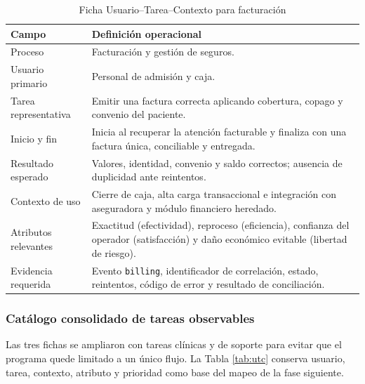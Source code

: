 \begin{table}[H]
\centering
\caption{Ficha Usuario--Tarea--Contexto para facturación}
\label{tab:utc-facturacion}
\begin{tabularx}{\textwidth}{p{3.5cm}Y}
\toprule
Campo & Definición operacional \\
\midrule
Proceso & Facturación y gestión de seguros. \\
Usuario primario & Personal de admisión y caja. \\
Tarea representativa & Emitir una factura correcta aplicando cobertura, copago y convenio del paciente. \\
Inicio y fin & Inicia al recuperar la atención facturable y finaliza con una factura única, conciliable y entregada. \\
Resultado esperado & Valores, identidad, convenio y saldo correctos; ausencia de duplicidad ante reintentos. \\
Contexto de uso & Cierre de caja, alta carga transaccional e integración con aseguradora y módulo financiero heredado. \\
Atributos relevantes & Exactitud (efectividad), reproceso (eficiencia), confianza del operador (satisfacción) y daño económico evitable (libertad de riesgo). \\
Evidencia requerida & Evento \texttt{billing}, identificador de correlación, estado, reintentos, código de error y resultado de conciliación. \\
\bottomrule
\end{tabularx}
\end{table}

\subsubsection{Catálogo consolidado de tareas observables}

Las tres fichas se ampliaron con tareas clínicas y de soporte para evitar que el programa quede limitado a un único flujo. La Tabla \ref{tab:utc} conserva usuario, tarea, contexto, atributo y prioridad como base del mapeo de la fase siguiente.

